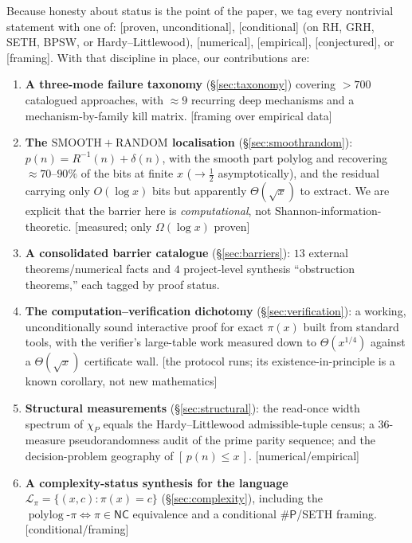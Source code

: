 \documentclass[11pt]{article}
\theoremstyle{plain}
\theoremstyle{definition}
\theoremstyle{remark}
\newcommand{\statline}[1]{\textnormal{\footnotesize\textsf{[\textcolor{accent}{#1}]}}}
\DeclareMathOperator{\polylog}{polylog}
\newcommand{\Rinv}{R^{-1}}
\newcommand{\chiP}{\chi_{P}}
\newcommand{\Lpi}{\mathcal{L}_{\pi}}
\newcommand{\sharpP}{\#\mathsf{P}}
\newcommand{\NC}{\mathsf{NC}}
\begin{document}
Because honesty about status is the point of the paper, we tag every nontrivial
statement with one of: \statline{proven, unconditional}, \statline{conditional}
(on RH, GRH, SETH, BPSW, or Hardy--Littlewood), \statline{numerical},
\statline{empirical}, \statline{conjectured}, or \statline{framing}. With that
discipline in place, our contributions are:

\begin{enumerate}[leftmargin=1.6em,itemsep=2pt]
\item \textbf{A three-mode failure taxonomy} (\S\ref{sec:taxonomy}) covering
${>}700$ catalogued approaches, with ${\approx}9$ recurring deep mechanisms and a
mechanism-by-family kill matrix. \statline{framing over empirical data}
\item \textbf{The $\mathrm{SMOOTH}+\mathrm{RANDOM}$ localisation}
(\S\ref{sec:smoothrandom}): $p(n)=\Rinv(n)+\delta(n)$, with the smooth part
polylog and recovering ${\approx}70$--$90\%$ of the bits at finite $x$
(${\to}\tfrac12$ asymptotically), and the residual carrying only
$O(\log x)$ bits but apparently $\Theta(\sqrt{x})$ to extract. We are explicit
that the barrier here is \emph{computational}, not Shannon-information-theoretic.
\statline{measured; only $\Omega(\log x)$ proven}
\item \textbf{A consolidated barrier catalogue} (\S\ref{sec:barriers}): $13$
external theorems/numerical facts and $4$ project-level synthesis ``obstruction
theorems,'' each tagged by proof status.
\item \textbf{The computation--verification dichotomy} (\S\ref{sec:verification}):
a working, unconditionally sound interactive proof for exact $\pi(x)$ built from
standard tools, with the verifier's large-table work measured down to
$\Theta(x^{1/4})$ against a $\Theta(\sqrt{x})$ certificate wall. \statline{the
protocol runs; its existence-in-principle is a known corollary, not new
mathematics}
\item \textbf{Structural measurements} (\S\ref{sec:structural}): the read-once
width spectrum of $\chiP$ equals the Hardy--Littlewood admissible-tuple census; a
$36$-measure pseudorandomness audit of the prime parity sequence; and the
decision-problem geography of $[\,p(n)\le x\,]$. \statline{numerical/empirical}
\item \textbf{A complexity-status synthesis for the language}
$\Lpi=\{(x,c):\pi(x)=c\}$ (\S\ref{sec:complexity}), including the
$\polylog\text{-}\pi \Leftrightarrow \pi\in\NC$ equivalence and a conditional
$\sharpP$/\textsf{SETH} framing. \statline{conditional/framing}
\end{enumerate}
\end{document}
